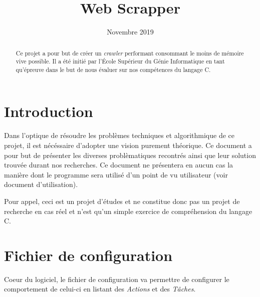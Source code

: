 \documentclass[conference]{IEEEtran}
\begin{document}
\title{Web Scrapper\\}

\author{
\and
{}
}
\date{Novembre 2019}

\maketitle

\begin{abstract}
Ce projet a pour but de créer un \textit{crawler} performant consommant le moins de mémoire vive possible. Il a été initié par l'École Supérieur du Génie Informatique en tant qu'épreuve dans le but de nous évaluer sur nos compétences du langage C.
\end{abstract}

\section{Introduction}

Dans l'optique de résoudre les problèmes techniques et algorithmique de ce projet, il est nécéssaire d'adopter une vision purement théorique.
Ce document a pour but de présenter les diverses problèmatiques recontrés ainsi que leur solution trouvée durant nos recherches. Ce document ne présentera en aucun cas la manière dont le programme sera utilisé d'un point de vu utilisateur (voir document d'utilisation).

Pour appel, ceci est un projet d'études et ne constitue donc pas un projet de recherche en cas réel et n'est qu'un simple exercice de compréhension du langage C.

\section{Fichier de configuration}

Coeur du logiciel, le fichier de configuration va permettre de configurer le comportement de celui-ci en listant des \textit{Actions} et des \textit{Tâches}.
\end{document}
